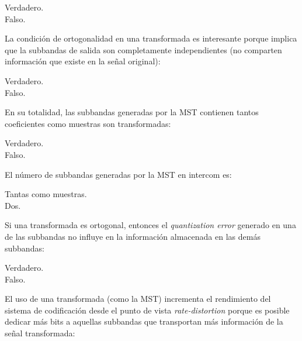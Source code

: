 \documentclass[legalpaper, 12pt, addpoints]{exam}
\begin{document}
\begin{questions}
\begin{oneparchoices}
  \choice Verdadero.\\
  \choice Falso.
\end{oneparchoices}
  
\vspace{0.10in}

\question La condición de ortogonalidad en una transformada es
interesante porque implica que la subbandas de salida son completamente
independientes (no comparten información que existe en la señal original):

\begin{oneparchoices}
  \choice Verdadero.\\
  \choice Falso.
\end{oneparchoices}
  
\vspace{0.10in}

\question En su totalidad, las subbandas generadas por la MST contienen tantos
coeficientes como muestras son transformadas:

\begin{oneparchoices}
  \choice Verdadero.\\
  \choice Falso.
\end{oneparchoices}
  
\vspace{0.10in}

\question El número de subbandas generadas por la MST en intercom es:

\begin{oneparchoices}
  \choice Tantas como muestras.\\
  \choice Dos.
\end{oneparchoices}
  
\vspace{0.10in}

\question Si una transformada es ortogonal, entonces el
\emph{quantization error} generado en una de las subbandas no influye
en la información almacenada en las demás subbandas:

\begin{oneparchoices}
  \choice Verdadero.\\
  \choice Falso.
\end{oneparchoices}
  
\vspace{0.10in}

\question El uso de una transformada (como la MST) incrementa el
rendimiento del sistema de codificación desde el punto de vista
\emph{rate-distortion} porque es posible dedicar más bits a aquellas
subbandas que transportan más información de la señal transformada:


\end{questions}
\end{document}
